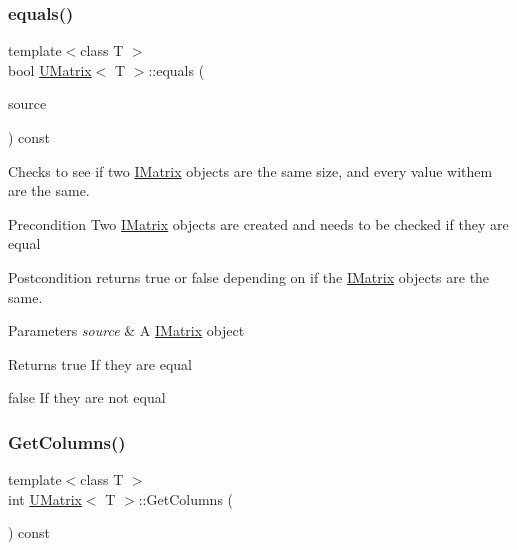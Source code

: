 \subsubsection{\texorpdfstring{equals()}{equals()}\hspace{0.1cm}{\footnotesize\ttfamily [6/6]}}
{\footnotesize\ttfamily template$<$class T $>$ \\
bool \mbox{\hyperlink{class_u_matrix}{U\+Matrix}}$<$ T $>$\+::equals (\begin{DoxyParamCaption}\item[{const \mbox{\hyperlink{class_i_matrix}{I\+Matrix}}$<$ \mbox{\hyperlink{class_d_matrix}{D\+Matrix}}$<$ T $>$, T $>$ \&}]{source }\end{DoxyParamCaption}) const}



Checks to see if two \mbox{\hyperlink{class_i_matrix}{I\+Matrix}} objects are the same size, and every value withem are the same. 

\begin{DoxyPrecond}{Precondition}
Two \mbox{\hyperlink{class_i_matrix}{I\+Matrix}} objects are created and needs to be checked if they are equal 
\end{DoxyPrecond}
\begin{DoxyPostcond}{Postcondition}
returns true or false depending on if the \mbox{\hyperlink{class_i_matrix}{I\+Matrix}} objects are the same.
\end{DoxyPostcond}

\begin{DoxyParams}{Parameters}
{\em source} & A \mbox{\hyperlink{class_i_matrix}{I\+Matrix}} object \\
\hline
\end{DoxyParams}
\begin{DoxyReturn}{Returns}
true If they are equal 

false If they are not equal 
\end{DoxyReturn}
\mbox{\label{class_u_matrix_a4065961abb79fd43d7abaf10c47e73d8}} 
\subsubsection{\texorpdfstring{GetColumns()}{GetColumns()}}
{\footnotesize\ttfamily template$<$class T $>$ \\
int \mbox{\hyperlink{class_u_matrix}{U\+Matrix}}$<$ T $>$\+::Get\+Columns (\begin{DoxyParamCaption}{ }\end{DoxyParamCaption}) const\hspace{0.3cm}{\ttfamily [virtual]}}



